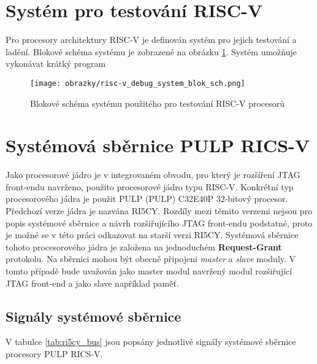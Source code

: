 \section{Systém pro testování \acs{RISC-V}}
Pro procesory architektury \acs{RISC-V} je definován systém pro jejich testování a ladění. Blokové schéma systému je zobrazené na obrázku \ref{fig:blok_sch_risc-v_dbg}. Systém umožňuje vykonávat krátký program 

\begin{figure}[!h]
  \begin{center}
    \texttt{[image: obrazky/risc-v\_debug\_system\_blok\_sch.png]}
  \end{center}
  \caption{Blokové schéma systému použitého pro testování \acs{RISC-V} procesorů \cite{risc-v_dbg}}
	\label{fig:blok_sch_risc-v_dbg}
\end{figure}

\section{Systémová sběrnice PULP RICS-V}
Jako procesorové jádro je v integrovaném obvodu, pro který je rozšíření JTAG front-endu navrženo, použito procesorové jádro typu \acs{RISC-V}. Konkrétní typ procesorového jádra je použit \acs{PULP} (\acl{PULP}) C32E40P 32-bitový procesor. Předchozí verze jádra je nazvána RI5CY. Rozdíly mezi těmito verzemi nejsou pro popis systémové sběrnice a návrh rozšiřujícího JTAG front-endu podstatné, proto je možné se v této práci odkazovat na starší verzi RI5CY. Systémová sběrnice tohoto procesorového jádra je založena na jednoduchém \textbf{Request-Grant} protokolu. Na sběrnici mohou být obecně připojeni \textit{master} a \textit{slave} moduly. V tomto případě bude uvažován jako master modul navržený modul rozšiřující JTAG front-end a jako slave například paměť.

\subsection{Signály systémové sběrnice}
V tabulce \ref{tab:ri5cy_bus} jsou popsány jednotlivé signály systémové sběrnice procesory PULP RICS-V.


